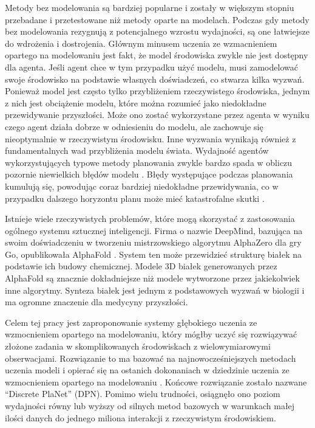 Metody bez modelowania są bardziej popularne i zostały w większym stopniu przebadane i przetestowane niż metody oparte na modelach. Podczas gdy metody bez modelowania rezygnują z potencjalnego wzrostu wydajności, są one łatwiejsze do wdrożenia i dostrojenia. Głównym minusem uczenia ze wzmacnieniem opartego na modelowaniu jest fakt, że model środowiska zwykle nie jest dostępny dla agenta. Jeśli agent chce w tym przypadku użyć modelu, musi zamodelować swoje środowisko na podstawie własnych doświadczeń, co stwarza kilka wyzwań. Ponieważ model jest często tylko przybliżeniem rzeczywistego środowiska, jednym z nich jest obciążenie modelu, które można rozumieć jako niedokładne przewidywanie przyszłości. Może ono zostać wykorzystane przez agenta \cite{Algo.WorldModels} w wyniku czego agent działa dobrze w odniesieniu do modelu, ale zachowuje się nieoptymalnie w rzeczywistym środowisku. Inne wyzwania wynikają również z fundamentalnych wad przybliżenia modelu świata. Wydajność agentów wykorzystujących typowe metody planowania zwykle bardzo spada w obliczu pozornie niewielkich błędów modelu \cite{Study.PlanWithImperfectModel}. Błędy występujące podczas planowania kumulują się, powodując coraz bardziej niedokładne przewidywania, co w przypadku dalszego horyzontu planu może mieć katastrofalne skutki \cite{Study.CompoundingModelError}.

Istnieje wiele rzeczywistych problemów, które mogą skorzystać z zastosowania ogólnego systemu sztucznej inteligencji. Firma o nazwie DeepMind, bazująca na swoim doświadczeniu w tworzeniu mistrzowskiego algorytmu AlphaZero \cite{Algo.AlphaZero} dla gry Go, opublikowała AlphaFold \cite{Algo.AlphaFold}. System ten może przewidzieć strukturę białek na podstawie ich budowy chemicznej. Modele 3D białek generowanych przez AlphaFold są znacznie dokładniejsze niż modele wytworzone przez jakiekolwiek inne algorytmy. Synteza białek jest jednym z podstawowych wyzwań w biologii i ma ogromne znaczenie dla medycyny przyszłości.

Celem tej pracy jest zaproponowanie systemy głębokiego uczenia ze wzmocnieniem opartego na modelowaniu, który mógłby uczyć się rozwiązywać złożone zadania w skomplikowanych środowiskach z wielowymiarowymi obserwacjami. Rozwiązanie to ma bazować na najnowocześniejszych metodach uczenia modeli \cite{Algo.RecurrentEnvSim}\cite{Algo.JointFrameRewardPrediction}\cite{Algo.FastGenerativeModels} i opierać się na ostanich dokonaniach w dziedzinie uczenia ze wzmocnieniem opartego na modelowaniu \cite{Algo.SimPLe}\cite{Algo.VPN }\cite{Algo.WorldModels}\cite{Algo.PlaNet}. Końcowe rozwiązanie zostało nazwane ``Discrete PlaNet'' (DPN). Pomimo wielu trudności, osiągnęło ono poziom wydajności równy lub wyższy od silnych metod bazowych w warunkach małej ilości danych do jednego miliona interakcji z rzeczywistym środowiskiem.


